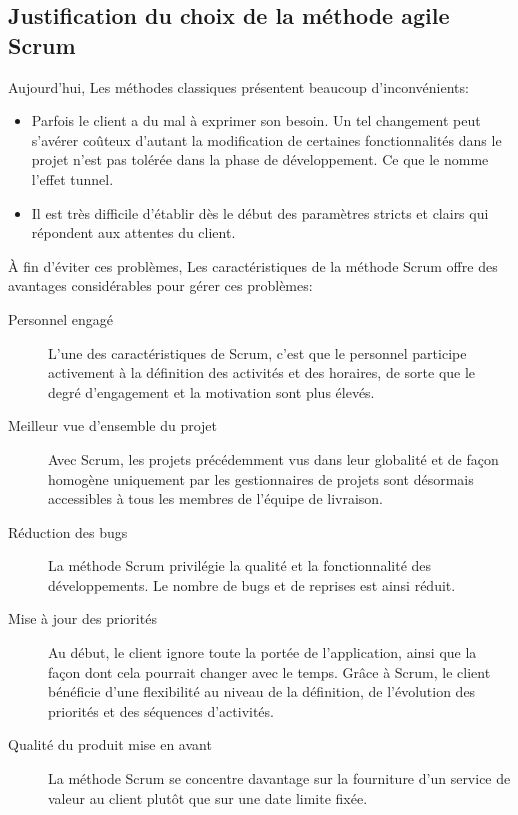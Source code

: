 \subsection{Justification du choix de la méthode agile Scrum}

Aujourd'hui, Les méthodes classiques présentent beaucoup d'inconvénients:

\begin{itemize}
    \item Parfois le client a du mal à exprimer son besoin. Un tel changement
        peut s'avérer coûteux d'autant la modification de certaines
        fonctionnalités dans le projet n'est pas tolérée dans la phase de
        développement. Ce que le nomme l'effet tunnel.
    \item Il est très difficile d'établir dès le début des paramètres stricts
        et clairs qui répondent aux attentes du client.
\end{itemize}

À fin d'éviter ces problèmes, Les caractéristiques de la méthode Scrum offre
des avantages considérables pour gérer ces problèmes:

\begin{description}
    \item [Personnel engagé] L'une des caractéristiques de Scrum, c'est que le
        personnel participe activement à la définition des activités et des
        horaires, de sorte que le degré d'engagement et la motivation sont plus
        élevés.
    \item [Meilleur vue d'ensemble du projet] Avec Scrum, les projets
        précédemment vus dans leur globalité et de façon homogène uniquement
        par les gestionnaires de projets sont désormais accessibles à tous les
        membres de l'équipe de livraison.
    \item [Réduction des bugs] La méthode Scrum privilégie la qualité et la
        fonctionnalité des développements. Le nombre de bugs et de reprises est
        ainsi réduit.
    \item [Mise à jour des priorités] Au début, le client ignore toute la
        portée de l'application, ainsi que la façon dont cela pourrait changer
        avec le temps. Grâce à Scrum, le client bénéficie d'une flexibilité au
        niveau de la définition, de l'évolution des priorités et des séquences
        d'activités.
    \item [Qualité du produit mise en avant] La méthode Scrum se concentre
        davantage sur la fourniture d'un service de valeur au client plutôt que
        sur une date limite fixée.
\end{description}


